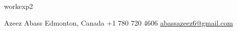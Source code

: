 \documentclass[a4paper]{modernsimplecv}
\begin{document}
    \pagebreak

    \begin{minipage}[t]{\textwidth}

        \vspace{1em}
        {workexp2}

        \vspace{1em}
    \end{minipage}



    \vspace{1em} %
    \setlength{\parindent}{0pt}
    \begin{minipage}[t]{\textwidth}
        \begin{center}\fontfamily{\sfdefault}\selectfont \color{black!70}
            {\small Azeez Abass  Edmonton, Canada  +1 780 720 4606 
             \protect\url{abassazeez6@gmail.com}
            }
        \end{center}
    \end{minipage}
\end{document}
